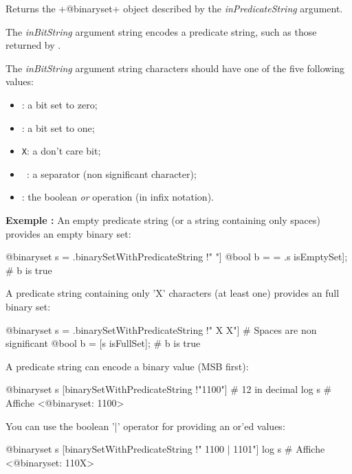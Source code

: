 Returns the \ggsq+@binaryset+ object described by the \emph{inPredicateString} argument.

The \emph{inBitString} argument string encodes a predicate string, such as those returned by .

\begin{description}
\item The \emph{inBitString} argument string characters should have one of the five following values:
\begin{itemize}
\item \texttt{\textquotesingle}: a bit set to zero;
\item \texttt{\textquotesingle}: a bit set to one;
\item \texttt{\textquotesingle X\textquotesingle}: a don't care bit;
\item \texttt{\textquotesingle~\textquotesingle}: a separator (non significant character);
\item \texttt{\textquotesingle\textbar\textquotesingle}: the boolean \emph{or} operation (in infix notation).
\end{itemize}
\end{description}


\textbf{Exemple :}
An empty predicate string (or a string containing only spaces) provides an empty binary set:
\begin{galgas4}
@binaryset s = .binarySetWithPredicateString !" "]
@bool b = = .s isEmptySet]; # b is true
\end{galgas4}


A predicate string containing only 'X' characters (at least one) provides an full binary set:
\begin{galgas4}
@binaryset s = .binarySetWithPredicateString !" X X"] # Spaces are non significant
@bool b = [s isFullSet]; # b is true
\end{galgas4}


A predicate string can encode a binary value (MSB first):
\begin{galgas4}
@binaryset s [binarySetWithPredicateString !"1100"] # 12 in decimal
log s # Affiche <@binaryset: 1100>
\end{galgas4}


You can use the boolean '|' operator for providing an or'ed values:
\begin{galgas4}
@binaryset s [binarySetWithPredicateString !" 1100 | 1101"]
log s # Affiche <@binaryset: 110X>
\end{galgas4}



